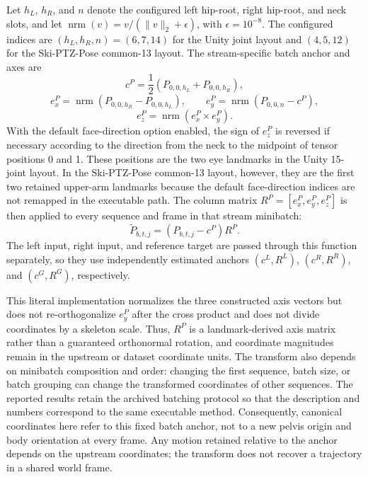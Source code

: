 \documentclass[11pt,letterpaper]{article}
\begin{document}
Let \(h_L\), \(h_R\), and \(n\) denote the configured left hip-root, right hip-root, and neck slots, and let \(\operatorname{nrm}(v)=v/(\|v\|_2+\epsilon)\), with \(\epsilon=10^{-8}\). The configured indices are \((h_L,h_R,n)=(6,7,14)\) for the Unity joint layout and \((4,5,12)\) for the Ski-PTZ-Pose common-13 layout. The stream-specific batch anchor and axes are
\[
c^P=\frac{1}{2}\left(P_{0,0,h_L}+P_{0,0,h_R}\right),
\]
\[
e_x^P=\operatorname{nrm}\!\left(P_{0,0,h_R}-P_{0,0,h_L}\right),
\qquad
e_y^P=\operatorname{nrm}\!\left(P_{0,0,n}-c^P\right),
\]
\[
e_z^P=\operatorname{nrm}\!\left(e_x^P\times e_y^P\right).
\]
With the default face-direction option enabled, the sign of \(e_z^P\) is reversed if necessary according to the direction from the neck to the midpoint of tensor positions 0 and 1. These positions are the two eye landmarks in the Unity 15-joint layout. In the Ski-PTZ-Pose common-13 layout, however, they are the first two retained upper-arm landmarks because the default face-direction indices are not remapped in the executable path. The column matrix \(R^P=[e_x^P,e_y^P,e_z^P]\) is then applied to every sequence and frame in that stream minibatch:
\[
\tilde{P}_{b,t,j}=\left(P_{b,t,j}-c^P\right)R^P.
\]
The left input, right input, and reference target are passed through this function separately, so they use independently estimated anchors \((c^L,R^L)\), \((c^R,R^R)\), and \((c^G,R^G)\), respectively.

This literal implementation normalizes the three constructed axis vectors but does not re-orthogonalize \(e_y^P\) after the cross product and does not divide coordinates by a skeleton scale. Thus, \(R^P\) is a landmark-derived axis matrix rather than a guaranteed orthonormal rotation, and coordinate magnitudes remain in the upstream or dataset coordinate units. The transform also depends on minibatch composition and order: changing the first sequence, batch size, or batch grouping can change the transformed coordinates of other sequences. The reported results retain the archived batching protocol so that the description and numbers correspond to the same executable method. Consequently, canonical coordinates here refer to this fixed batch anchor, not to a new pelvis origin and body orientation at every frame. Any motion retained relative to the anchor depends on the upstream coordinates; the transform does not recover a trajectory in a shared world frame.
\end{document}
